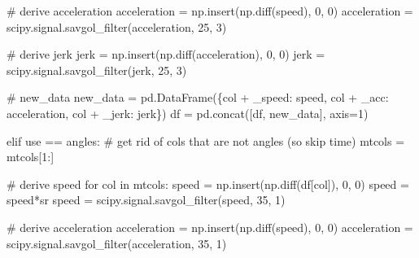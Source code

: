 \documentclass[
  letterpaper,
  DIV=11,
  numbers=noendperiod]{scrreprt}
\newenvironment{Shaded}{\begin{snugshade}}{\end{snugshade}}
\newcommand{\CommentTok}[1]{\textcolor[rgb]{0.37,0.37,0.37}{#1}}
\newcommand{\ControlFlowTok}[1]{\textcolor[rgb]{0.00,0.23,0.31}{#1}}
\newcommand{\DecValTok}[1]{\textcolor[rgb]{0.68,0.00,0.00}{#1}}
\newcommand{\KeywordTok}[1]{\textcolor[rgb]{0.00,0.23,0.31}{#1}}
\newcommand{\NormalTok}[1]{\textcolor[rgb]{0.00,0.23,0.31}{#1}}
\newcommand{\OperatorTok}[1]{\textcolor[rgb]{0.37,0.37,0.37}{#1}}
\newcommand{\StringTok}[1]{\textcolor[rgb]{0.13,0.47,0.30}{#1}}
\begin{document}
\begin{Shaded}
\begin{Highlighting}[]
            \CommentTok{\# derive acceleration   }
\NormalTok{            acceleration }\OperatorTok{=}\NormalTok{ np.insert(np.diff(speed), }\DecValTok{0}\NormalTok{, }\DecValTok{0}\NormalTok{)}
\NormalTok{            acceleration }\OperatorTok{=}\NormalTok{ scipy.signal.savgol\_filter(acceleration, }\DecValTok{25}\NormalTok{, }\DecValTok{3}\NormalTok{)}

            \CommentTok{\# derive jerk}
\NormalTok{            jerk }\OperatorTok{=}\NormalTok{ np.insert(np.diff(acceleration), }\DecValTok{0}\NormalTok{, }\DecValTok{0}\NormalTok{)}
\NormalTok{            jerk }\OperatorTok{=}\NormalTok{ scipy.signal.savgol\_filter(jerk, }\DecValTok{25}\NormalTok{, }\DecValTok{3}\NormalTok{)}

            \CommentTok{\# new\_data}
\NormalTok{            new\_data }\OperatorTok{=}\NormalTok{ pd.DataFrame(\{col }\OperatorTok{+} \StringTok{\textquotesingle{}\_speed\textquotesingle{}}\NormalTok{: speed, col }\OperatorTok{+} \StringTok{\textquotesingle{}\_acc\textquotesingle{}}\NormalTok{: acceleration, col }\OperatorTok{+} \StringTok{\textquotesingle{}\_jerk\textquotesingle{}}\NormalTok{: jerk\})}
\NormalTok{            df }\OperatorTok{=}\NormalTok{ pd.concat([df, new\_data], axis}\OperatorTok{=}\DecValTok{1}\NormalTok{)}

    \ControlFlowTok{elif}\NormalTok{ use }\OperatorTok{==} \StringTok{\textquotesingle{}angles\textquotesingle{}}\NormalTok{:}
        \CommentTok{\# get rid of cols that are not angles (so skip time)}
\NormalTok{        mtcols }\OperatorTok{=}\NormalTok{ mtcols[}\DecValTok{1}\NormalTok{:]}

        \CommentTok{\# derive speed}
        \ControlFlowTok{for}\NormalTok{ col }\KeywordTok{in}\NormalTok{ mtcols:}
\NormalTok{            speed }\OperatorTok{=}\NormalTok{ np.insert(np.diff(df[col]), }\DecValTok{0}\NormalTok{, }\DecValTok{0}\NormalTok{)}
\NormalTok{            speed }\OperatorTok{=}\NormalTok{ speed}\OperatorTok{*}\NormalTok{sr}
\NormalTok{            speed }\OperatorTok{=}\NormalTok{ scipy.signal.savgol\_filter(speed, }\DecValTok{35}\NormalTok{, }\DecValTok{1}\NormalTok{)}

            \CommentTok{\# derive acceleration}
\NormalTok{            acceleration }\OperatorTok{=}\NormalTok{ np.insert(np.diff(speed), }\DecValTok{0}\NormalTok{, }\DecValTok{0}\NormalTok{)}
\NormalTok{            acceleration }\OperatorTok{=}\NormalTok{ scipy.signal.savgol\_filter(acceleration, }\DecValTok{35}\NormalTok{, }\DecValTok{1}\NormalTok{)}
            

\end{Highlighting}
\end{Shaded}
\end{document}
